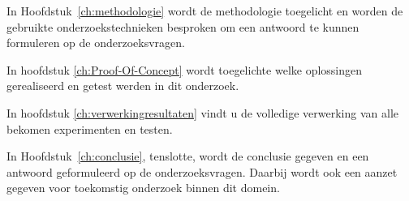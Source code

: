 In Hoofdstuk~\ref{ch:methodologie} wordt de methodologie toegelicht en worden de gebruikte onderzoekstechnieken besproken om een antwoord te kunnen formuleren op de onderzoeksvragen.

In hoofdstuk \ref{ch:Proof-Of-Concept} wordt toegelichte welke oplossingen gerealiseerd en getest werden in dit onderzoek.

In hoofdstuk \ref{ch:verwerkingresultaten} vindt u de volledige verwerking van alle bekomen experimenten en testen.

In Hoofdstuk~\ref{ch:conclusie}, tenslotte, wordt de conclusie gegeven en een antwoord geformuleerd op de onderzoeksvragen. Daarbij wordt ook een aanzet gegeven voor toekomstig onderzoek binnen dit domein.

